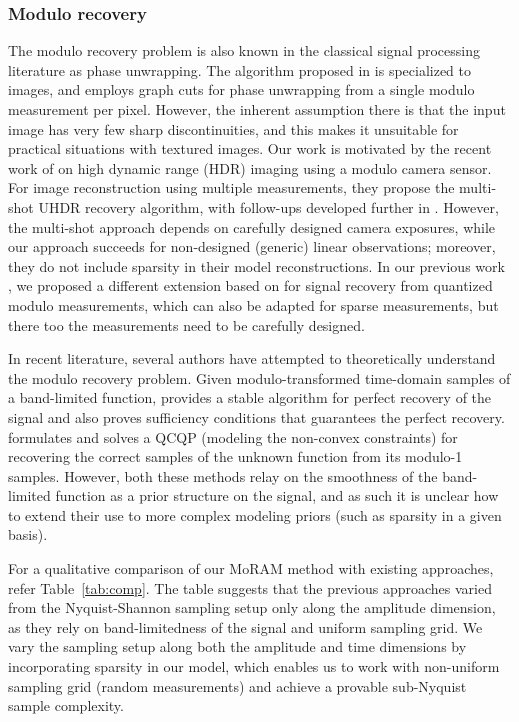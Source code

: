 \subsubsection*{Modulo recovery} The modulo recovery problem is also known in the classical signal processing literature
as phase unwrapping. The algorithm proposed in \cite{bioucas2007phase} is specialized to images, and employs graph cuts for phase unwrapping from a single modulo measurement per pixel. However, the inherent assumption there is that the input image has very few sharp discontinuities, and this makes it unsuitable for practical situations with textured images. Our work is motivated by the recent work of \cite{ICCP15_Zhao} on high dynamic range (HDR) imaging using a modulo camera sensor. For image reconstruction using multiple measurements, they propose the multi-shot UHDR recovery algorithm, with follow-ups developed further in \cite{Lang2017}. However, the multi-shot approach depends on carefully designed camera exposures, while our approach succeeds for non-designed (generic) linear observations; moreover, they do not include sparsity in their model reconstructions. In our previous work \cite{Shah}, we proposed a different extension based on \cite{ICCP15_Zhao, soltani2017stable} for signal recovery from quantized modulo measurements, which can also be adapted for sparse measurements, but there too the measurements need to be carefully designed.

In recent literature, several authors have attempted to theoretically understand the modulo recovery problem. Given modulo-transformed time-domain samples of a band-limited function, \cite{Bhandari} provides a stable algorithm for perfect recovery of the signal and also proves sufficiency conditions that guarantees the perfect recovery. \cite{Cucuringu2017} formulates and solves a QCQP (modeling the non-convex constraints) for recovering the correct samples of the unknown function from its modulo-1 samples. However, both these methods relay on the smoothness of the band-limited function as a prior structure on the signal, and as such it is unclear how to extend their use to more complex modeling priors (such as sparsity in a given basis). 

For a qualitative comparison of our MoRAM method with existing approaches, refer Table~\ref{tab:comp}. The table suggests that the previous approaches varied from the Nyquist-Shannon sampling setup only along the amplitude dimension, as they rely on band-limitedness of the signal and uniform sampling grid. We vary the sampling setup along both the amplitude and time dimensions by incorporating sparsity in our model, which enables us to work with non-uniform sampling grid (random measurements) and achieve a provable sub-Nyquist sample complexity.


